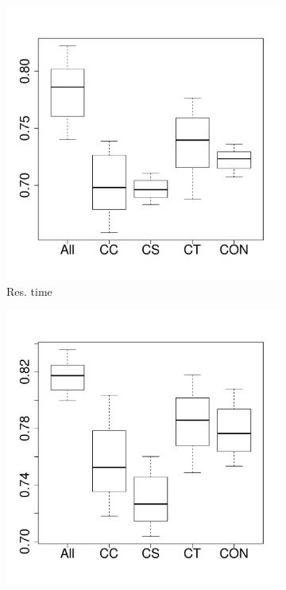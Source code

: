 \begin{figure}[t]
	\centering
        \begin{subfigure}{0.19\textwidth}
                \includegraphics[width=\linewidth]{Figures/runtime-cassandrakeep-importance.pdf}
                \caption{Res. time}
        \end{subfigure}%
        \begin{subfigure}{0.19\textwidth}
                \includegraphics[width=\linewidth]{Figures/cpu-cassandrakeep-importance.pdf}

\end{subfigure}
\end{figure}
